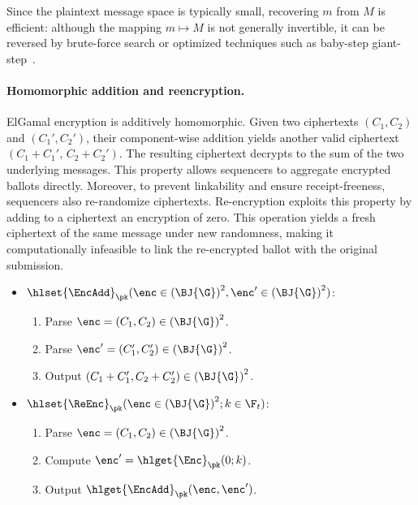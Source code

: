 Since the plaintext message space is typically small, recovering $m$ from $M$ is efficient: although the mapping $m \mapsto M$ is not generally invertible, it can be reversed by brute-force search or optimized techniques such as baby-step giant-step~\cite{blake1995elliptic}.%

\paragraph{Homomorphic addition and reencryption.} ElGamal encryption is additively homomorphic. Given two ciphertexts $(C_1, C_2)$ and $(C_1', C_2')$, their component-wise addition yields another valid ciphertext $(C_1 + C_1',\, C_2 + C_2')$. The resulting ciphertext decrypts to the sum of the two underlying messages. This property allows sequencers to aggregate encrypted ballots directly. Moreover, to prevent linkability and ensure receipt-freeness, sequencers also re-randomize ciphertexts. Re-encryption exploits this property by adding to a ciphertext an encryption of zero. This operation yields a fresh ciphertext of the same message under new randomness, making it computationally infeasible to link the re-encrypted ballot with the original submission.

\begin{mdframed}
	\begin{minipage}[t]{0.53\textwidth}
		\begin{itemize}
			\item[$\bullet$] $\hlset{\EncAdd}_{\pk}(\enc \in {(\BJ{\G})}^2, \enc' \in {(\BJ{\G})}^2)$:
			\begin{enumerate}
				\item Parse $\enc = (C_1, C_2) \in {(\BJ{\G})}^2$.
				\item Parse $\enc' = (C_1', C_2') \in {(\BJ{\G})}^2$.
				\item Output $(C_1 + C_1', C_2 + C_2') \in {(\BJ{\G})}^2$.
			\end{enumerate}
		\end{itemize}
	\end{minipage}
	\begin{minipage}[t]{0.45\textwidth}
		\begin{itemize}
			\item[$\bullet$] $\hlset{\ReEnc}_{\pk}(\enc \in {(\BJ{\G})}^2; k\in\F_t)$: \vspace{0.1cm}
			\begin{enumerate}
				\item Parse $\enc = (C_1, C_2) \in {(\BJ{\G})}^2$.
				\item Compute $\enc' = \hlget{\Enc}_{\pk}(0; k)$.
				\item Output $\hlget{\EncAdd}_{\pk}(\enc, \enc')$.
			\end{enumerate}
		\end{itemize}
	\end{minipage}
\end{mdframed}

